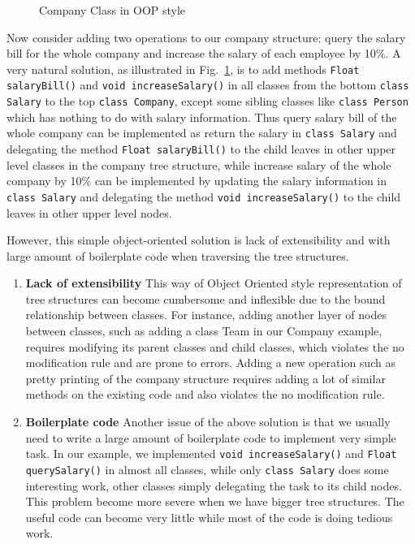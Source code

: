 \begin{figure}[tb]
\vspace{-.1in}
\caption{Company Class in OOP style}
\label{oop_company}
\end{figure}

Now consider adding two operations to our company structure: query the
salary bill for the whole company and increase the salary of each
employee by 10\%. A very natural solution, as illustrated in Fig.~\ref{oop_company}, is to add methods \lstinline{Float salaryBill()} and \lstinline{void increaseSalary()} in all classes from the bottom \lstinline{class Salary} to the top \lstinline{class Company}, except some sibling classes like \lstinline{class Person} which has nothing to do with salary information. Thus query salary bill of the whole company can be implemented as return the salary in \lstinline{class Salary} and delegating the method \lstinline{Float salaryBill()} to the child leaves in other upper level classes in the company tree structure, while increase salary of the whole company by 10\% can be implemented by updating the salary information in \lstinline{class Salary} and delegating the method \lstinline{void increaseSalary()} to the child leaves in other upper level nodes.  

However, this simple object-oriented solution is lack of extensibility and with large amount of boilerplate code when traversing the tree structures. 

\begin{enumerate}

\item {\bf Lack of extensibility} 
This way of Object Oriented style representation of tree structures can become cumbersome and inflexible due to the bound relationship between classes. For instance, adding another layer of nodes between classes, such as adding a class Team in our Company example, requires modifying its parent classes and child classes, which violates the no modification rule and are prone to errors. Adding a new operation such as pretty printing of the company structure requires adding a lot of similar methods on the existing code and also violates the no modification rule.

\item {\bf Boilerplate code} 
Another issue of the above solution is that we usually need to write a large amount of boilerplate code to implement very simple task. In our example, we implemented \lstinline{void increaseSalary()} and \lstinline{Float querySalary()} in almost all classes, while only \lstinline{class Salary} does some interesting work, other classes simply delegating the task to its child nodes. This problem become more severe when we have bigger tree structures. The useful code can become very little while most of the code is doing tedious work. 

\end{enumerate}

